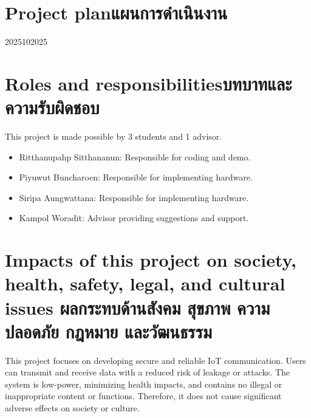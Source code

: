 \section{\ifenglish Project plan\else แผนการดำเนินงาน\fi}

\begin{plan}{6}{2025}{10}{2025}
\end{plan}



\section{\ifenglish Roles and responsibilities\else บทบาทและความรับผิดชอบ\fi}
This project is made possible by 3 students and 1 advisor.
 \begin{itemize} 
            \item Ritthanupahp Sitthananun: Responsible for coding and demo.
            \item Piyuwut Buncharoen: Responsible for implementing hardware.
            \item Siripa Aungwattana: Responsible for implementing hardware.
            \item Kampol Woradit: Advisor providing suggestions and support.
        \end{itemize}

\section{\ifenglish%
Impacts of this project on society, health, safety, legal, and cultural issues
\else%
ผลกระทบด้านสังคม สุขภาพ ความปลอดภัย กฎหมาย และวัฒนธรรม
\fi}
This project focuses on developing secure and reliable IoT communication. Users can transmit and receive data with a reduced risk of leakage or attacks. The system is low-power, minimizing health impacts, and contains no illegal or inappropriate content or functions. Therefore, it does not cause significant adverse effects on society or culture.
